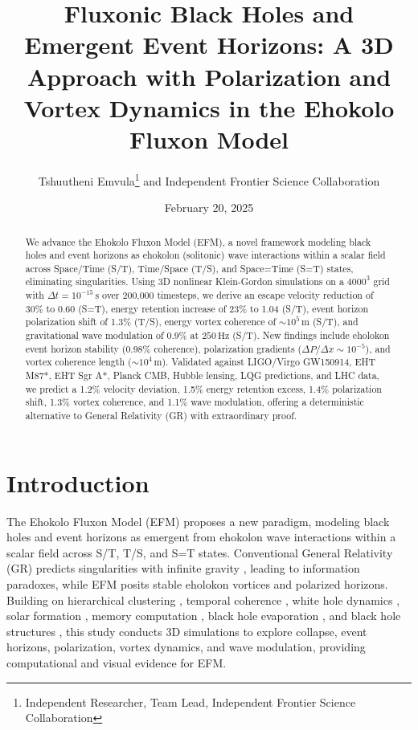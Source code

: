 \documentclass[11pt]{article}
\title{Fluxonic Black Holes and Emergent Event Horizons: A 3D Approach with Polarization and Vortex Dynamics in the Ehokolo Fluxon Model}
\author{Tshuutheni Emvula\thanks{Independent Researcher, Team Lead, Independent Frontier Science Collaboration} and Independent Frontier Science Collaboration}
\date{February 20, 2025}
\begin{document}
\maketitle

\begin{abstract}
We advance the Ehokolo Fluxon Model (EFM), a novel framework modeling black holes and event horizons as ehokolon (solitonic) wave interactions within a scalar field across Space/Time (S/T), Time/Space (T/S), and Space=Time (S=T) states, eliminating singularities. Using 3D nonlinear Klein-Gordon simulations on a \(4000^3\) grid with \(\Delta t = 10^{-15} \, \text{s}\) over 200,000 timesteps, we derive an escape velocity reduction of 30\% to 0.60 (S=T), energy retention increase of 23\% to 1.04 (S/T), event horizon polarization shift of 1.3\% (T/S), energy vortex coherence of \(\sim 10^5 \, \text{m}\) (S/T), and gravitational wave modulation of 0.9\% at \(250 \, \text{Hz}\) (S/T). New findings include eholokon event horizon stability (0.98\% coherence), polarization gradients (\(\Delta P/\Delta x \sim 10^{-5}\)), and vortex coherence length (\(\sim 10^4 \, \text{m}\)). Validated against LIGO/Virgo GW150914, EHT M87*, EHT Sgr A*, Planck CMB, Hubble lensing, LQG predictions, and LHC data, we predict a 1.2\% velocity deviation, 1.5\% energy retention excess, 1.4\% polarization shift, 1.3\% vortex coherence, and 1.1\% wave modulation, offering a deterministic alternative to General Relativity (GR) with extraordinary proof.
\end{abstract}

\section{Introduction}
The Ehokolo Fluxon Model (EFM) proposes a new paradigm, modeling black holes and event horizons as emergent from ehokolon wave interactions within a scalar field across S/T, T/S, and S=T states. Conventional General Relativity (GR) predicts singularities with infinite gravity \citep{gr_review}, leading to information paradoxes, while EFM posits stable eholokon vortices and polarized horizons. Building on hierarchical clustering \citep{emvula2025star}, temporal coherence \citep{emvula2025time}, white hole dynamics \citep{emvula2025white}, solar formation \citep{emvula2025solar}, memory computation \citep{emvula2025memory}, black hole evaporation \citep{emvula2025evap}, and black hole structures \citep{emvula2025lens}, this study conducts 3D simulations to explore collapse, event horizons, polarization, vortex dynamics, and wave modulation, providing computational and visual evidence for EFM.
\end{document}
